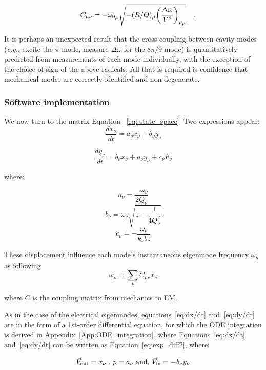 \documentclass[a4paper,12pt]{article}
\newcommand{\be}{\begin{equation}}
\newcommand{\ee}{\end{equation}}
\begin{document}
\begin{equation}
 C_{\mu\nu} = -\omega_{0_{\mu}} \sqrt{-(R/Q)_{\mu}{ \left(\frac{\Delta \omega}{ V^2}\right)_{\nu \mu}}}\rlap{~~~.}
\end{equation}

It is perhaps an unexpected result that the cross-coupling between cavity modes ({\it e.g.}, excite the $\pi$ mode, measure $\Delta\omega$ for the $8\pi/9$ mode) is quantitatively predicted from measurements of each mode individually, with the exception of the choice of sign of the above radicals.  All that is required is confidence that mechanical modes are correctly identified and non-degenerate.

\subsubsection{Software implementation}

We now turn to the matrix Equation ~\ref{eq: state_space}. Two expressions appear:
\begin{equation}
  \frac{dx_{\nu}}{dt} = a_{\nu}x_{\nu} - b_{\nu}y_{\nu}
  \label{eq:dx/dt}
\end{equation}

\begin{equation}
  \frac{dy_{\nu}}{dt} = b_{\nu}x_{\nu} + a_{\nu}y_{\nu} + c_{\nu}F_{\nu}
  \label{eq:dy/dt}
\end{equation}

where: 

\be
a_{\nu} =  \frac{-\omega_{\nu}}{2Q_{\nu}} 
\ee
\be
b_{\nu} = \omega_{\nu} \sqrt{1 - \frac{1}{4Q_{\nu}^{2}}} 
\ee
\be
c_{\nu} = -\frac{\omega_{\nu}}{k_{\nu}b_{\nu}}
\ee

These displacement influence each mode's instantaneous  eigenmode frequency $\omega_{\mu}$ as following
\be
\label{eq_wmu}
\omega_\mu = \sum_\nu C_{\mu\nu} x_\nu
\ee

where $C$ is the coupling matrix from mechanics to EM.

As in the case of the electrical eigenmodes, equations~\ref{eq:dx/dt} and~\ref{eq:dy/dt} are in the form of a 1st-order differential equation, for which the ODE integration is derived in Appendix~\ref{App:ODE_integration}, where Equations~\ref{eq:dx/dt} and~\ref{eq:dy/dt} can be written as Equation~\ref{eq:exp_diff2}, where:

\begin{equation}
 \vec V_{\rm out} = x_{\nu} \mbox{ , } p = a_{\nu} \mbox{ and, } \vec V_{\rm in} = -b_{\nu}y_{\nu}
\end{equation}
\end{document}
